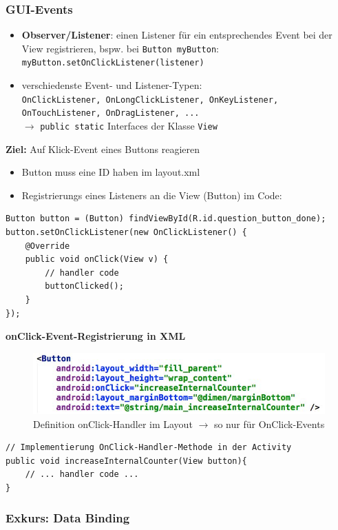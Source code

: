 \documentclass[a4paper]{article}
\begin{document}
\subsubsection{GUI-Events}
\begin{itemize}
	\item \textbf{Observer/Listener}: einen Listener für ein entsprechendes Event bei der View registrieren, bspw. bei \texttt{Button myButton}:\\
	\texttt{myButton.setOnClickListener(listener)}
	\item verschiedenste Event- und Listener-Typen:\\
	\texttt{OnClickListener,  OnLongClickListener,  OnKeyListener,  OnTouchListener,  OnDragListener, ...} 
	\\$\rightarrow$ \texttt{public static} Interfaces der Klasse \texttt{View}
\end{itemize}
\textbf{Ziel:} Auf Klick-Event eines Buttons reagieren
\begin{itemize}
	\item Button muss eine ID haben im layout.xml
	\item Registrierungs eines Listeners an die View (Button) im Code:
\end{itemize}
\begin{lstlisting}
Button button = (Button) findViewById(R.id.question_button_done);
button.setOnClickListener(new OnClickListener() {
	@Override
	public void onClick(View v) {
		// handler code
		buttonClicked();
	}
});
\end{lstlisting}
\textbf{onClick-Event-Registrierung in XML}
\begin{figure}[htb!]
	\centering
	\includegraphics[width=0.6\linewidth]{img/onclick.jpg}
	\caption{Definition onClick-Handler im Layout $\rightarrow$ so nur für OnClick-Events}
\end{figure}
\begin{lstlisting}
// Implementierung OnClick-Handler-Methode in der Activity
public void increaseInternalCounter(View button){
	// ... handler code ...
}
\end{lstlisting}

\newpage

\subsubsection{Exkurs: Data Binding}
\end{document}
